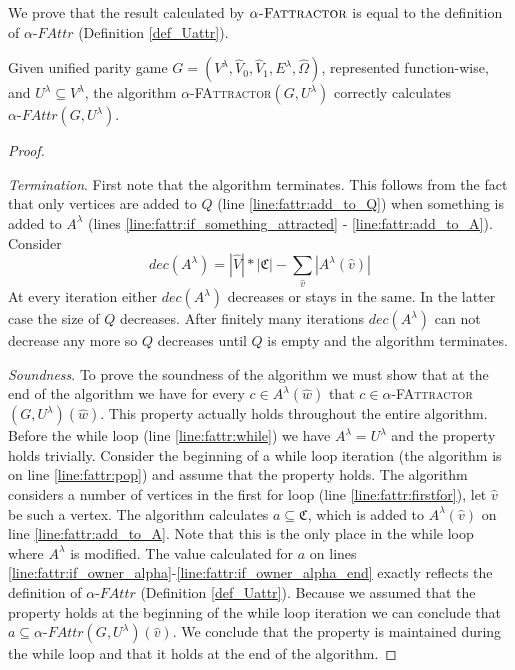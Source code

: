 We prove that the result calculated by $\alpha\textsc{-Fattractor}$ is equal to the definition of $\alpha\textit{-FAttr}$ (Definition \ref{def_Uattr}). 

\begin{theorem}
Given unified parity game $G = (V^\lambda, \hat{V}_0,\hat{V}_1,E^\lambda,\hat{\Omega})$, represented function-wise, and $U^\lambda \subseteq V^\lambda$, the algorithm $\alpha$-\textsc{FAttractor}$(G, U^\lambda)$ correctly calculates $\alpha\textit{-FAttr}(G,U^\lambda)$.
	\begin{proof}\ 
		
		\textit{Termination}. First note that the algorithm terminates. This follows from the fact that only vertices are added to $Q$ (line \ref{line:fattr:add_to_Q}) when something is added to $A^\lambda$ (lines \ref{line:fattr:if_something_attracted} - \ref{line:fattr:add_to_A}). Consider
		\[ \textit{dec}(A^\lambda) = |\hat{V}|*|\mathfrak{C}| - \sum_{\hat{v}}|A^\lambda(\hat{v})| \]
		At every iteration either $\textit{dec}(A^\lambda)$ decreases or stays in the same. In the latter case the size of $Q$ decreases. After finitely many iterations $\textit{dec}(A^\lambda)$ can not decrease any more so $Q$ decreases until $Q$ is empty and the algorithm terminates.
		
		\textit{Soundness}. To prove the soundness of the algorithm we must show that at the end of the algorithm we have for every $c\in A^\lambda(\hat{w})$ that $c \in \alpha$-\textsc{FAttractor}$(G, U^\lambda)(\hat{w})$. This property actually holds throughout the entire algorithm. Before the while loop (line \ref{line:fattr:while}) we have $A^\lambda = U^\lambda$ and the property holds trivially. Consider the beginning of a while loop iteration (the algorithm is on line \ref{line:fattr:pop}) and assume that the property holds. The algorithm considers a number of vertices in the first for loop (line \ref{line:fattr:firstfor}), let $\hat{v}$ be such a vertex. The algorithm calculates $a \subseteq \mathfrak{C}$, which is added to $A^\lambda(\hat{v})$ on line \ref{line:fattr:add_to_A}. Note that this is the only place in the while loop where $A^\lambda$ is modified. The value calculated for $a$ on lines \ref{line:fattr:if_owner_alpha}-\ref{line:fattr:if_owner_alpha_end} exactly reflects the definition of $\alpha\textit{-FAttr}$ (Definition \ref{def_Uattr}). Because we assumed that the property holds at the beginning of the while loop iteration we can conclude that $a \subseteq \alpha\textit{-FAttr}(G,U^\lambda)(\hat{v})$. We conclude that the property is maintained during the while loop and that it holds at the end of the algorithm.
		

\end{proof}
\end{theorem}
